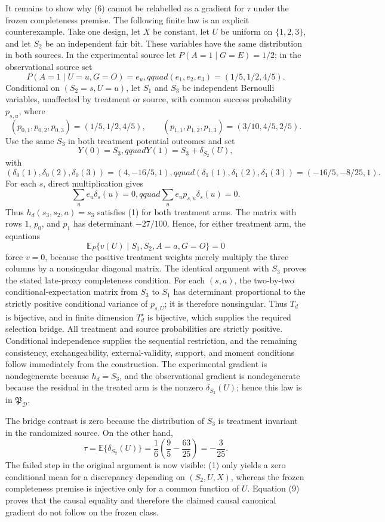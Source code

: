 It remains to show why (6) cannot be relabelled as a gradient for \(\tau\) under the frozen completeness premise.  The following finite law is an explicit counterexample.  Take one design, let \(X\) be constant, let \(U\) be uniform on \(\{1,2,3\}\), and let \(S_2\) be an independent fair bit.  These variables have the same distribution in both sources.  In the experimental source let \(P(A=1\mid G=E)=1/2\); in the observational source set
\[
 P(A=1\mid U=u,G=O)=e_u,qquad (e_1,e_2,e_3)=(1/5,1/2,4/5).
\]
Conditional on \((S_2=s,U=u)\), let \(S_1\) and \(S_3\) be independent Bernoulli variables, unaffected by treatment or source, with common success probability \(p_{s,u}\), where
\[
 (p_{0,1},p_{0,2},p_{0,3})=(1/5,1/2,4/5),\qquad
 (p_{1,1},p_{1,2},p_{1,3})=(3/10,4/5,2/5).
\]
Use the same \(S_3\) in both treatment potential outcomes and set
\[
 Y(0)=S_3,qquad Y(1)=S_3+\delta_{S_2}(U),
\]
with
\[
 (\delta_0(1),\delta_0(2),\delta_0(3))=(4,-16/5,1),qquad
 (\delta_1(1),\delta_1(2),\delta_1(3))=(-16/5,-8/25,1).
\]
For each \(s\), direct multiplication gives
\[
 \sum_u e_u\delta_s(u)=0,qquad
 \sum_u e_up_{s,u}\delta_s(u)=0. \tag{8}
\]
Thus \(h_d(s_3,s_2,a)=s_3\) satisfies (1) for both treatment arms.  The matrix with rows \(1\), \(p_0\), and \(p_1\) has determinant \(-27/100\).  Hence, for either treatment arm, the equations
\[
 \mathbb E_P\{v(U)\mid S_1,S_2,A=a,G=O\}=0
\]
force \(v=0\), because the positive treatment weights merely multiply the three columns by a nonsingular diagonal matrix.  The identical argument with \(S_3\) proves the stated late-proxy completeness condition.  For each \((s,a)\), the two-by-two conditional-expectation matrix from \(S_3\) to \(S_1\) has determinant proportional to the strictly positive conditional variance of \(p_{s,U}\); it is therefore nonsingular.  Thus \(T_d\) is bijective, and in finite dimension \(T_d^\star\) is bijective, which supplies the required selection bridge.  All treatment and source probabilities are strictly positive.  Conditional independence supplies the sequential restriction, and the remaining consistency, exchangeability, external-validity, support, and moment conditions follow immediately from the construction.  The experimental gradient is nondegenerate because \(h_d=S_3\), and the observational gradient is nondegenerate because the residual in the treated arm is the nonzero \(\delta_{S_2}(U)\); hence this law is in \(\mathfrak P_{\mathcal D}\).

The bridge contrast is zero because the distribution of \(S_3\) is treatment invariant in the randomized source.  On the other hand,
\[
 \tau=\mathbb E\{\delta_{S_2}(U)\}
 =\frac16\left(\frac95-\frac{63}{25}\right)=-\frac3{25}. \tag{9}
\]
The failed step in the original argument is now visible: (1) only yields a zero conditional mean for a discrepancy depending on \((S_2,U,X)\), whereas the frozen completeness premise is injective only for a common function of \(U\).  Equation (9) proves that the causal equality and therefore the claimed causal canonical gradient do not follow on the frozen class.